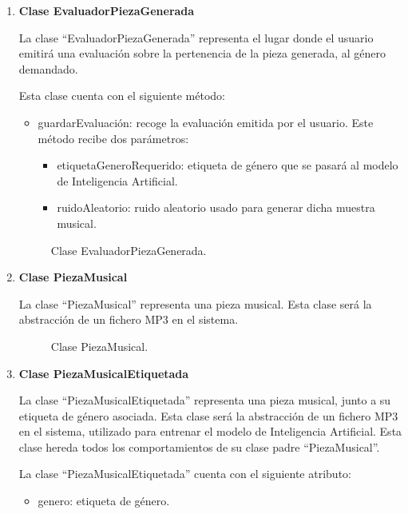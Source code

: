 \begin{enumerate}
  \item \textbf{Clase EvaluadorPiezaGenerada}

  La clase ``EvaluadorPiezaGenerada'' representa el lugar donde el usuario emitirá una evaluación sobre la pertenencia de la pieza generada, al género demandado.

  Esta clase cuenta con el siguiente método:

  \begin{itemize}
      \item guardarEvaluación: recoge la evaluación emitida por el usuario. Este método recibe dos parámetros:
      \begin{itemize}
          \item etiquetaGeneroRequerido: etiqueta de género que se pasará al modelo de Inteligencia Artificial.
          \item ruidoAleatorio: ruido aleatorio usado para generar dicha muestra musical.
      \end{itemize}
  \end{itemize}

  \begin{figure}[H]
    \centering
    
    \caption{Clase EvaluadorPiezaGenerada.}
  \end{figure}

  \item \textbf{Clase PiezaMusical}

  La clase ``PiezaMusical'' representa una pieza musical. Esta clase será la abstracción de un fichero MP3 en el sistema.

  \begin{figure}[H]
    \centering
    
    \caption{Clase PiezaMusical.}
  \end{figure}

  \item \textbf{Clase PiezaMusicalEtiquetada}

  La clase ``PiezaMusicalEtiquetada'' representa una pieza musical, junto a su etiqueta de género asociada. Esta clase será la abstracción de un fichero MP3 en el sistema, utilizado para entrenar el modelo de Inteligencia Artificial. Esta clase hereda todos los comportamientos de su clase padre ``PiezaMusical''.

  La clase ``PiezaMusicalEtiquetada'' cuenta con el siguiente atributo:

  \begin{itemize}
      \item genero: etiqueta de género.
  \end{itemize}


\end{enumerate}
